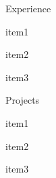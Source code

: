 \documentclass{resume}
\begin{document}
\begin{rSection}{Experience}
\begin{rSubsection}{}{}{}{}
\item item1
\item item2
\item item3
\end{rSubsection}
\end{rSection}
\begin{rSection}{Projects}
\begin{rSubsection}{}{}{}{}
\item item1
\item item2
\item item3
\end{rSubsection}
\end{rSection}
\end{document}
